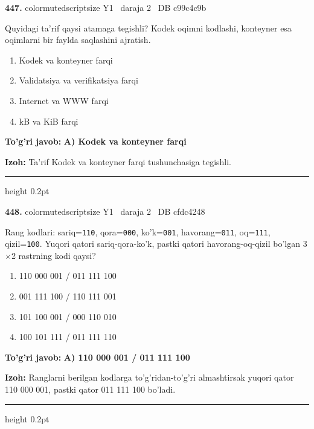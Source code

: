 \documentclass[10pt,a4paper,oneside]{article}
\begin{document}
\noindent\textbf{\color{ink}447.}  {color{muted}scriptsize Y1 \textbullet\ daraja 2 \textbullet\ DB c99c4c9b}
\par
Quyidagi ta'rif qaysi atamaga tegishli? Kodek oqimni kodlashi, konteyner esa oqimlarni bir faylda saqlashini ajratish.
\begin{enumerate}[label=\Alph*),leftmargin=9mm]
\item Kodek va konteyner farqi
\item Validatsiya va verifikatsiya farqi
\item Internet va WWW farqi
\item kB va KiB farqi
\end{enumerate}
\begin{tcolorbox}[enhanced,breakable,colback=teal!4,colframe=teal!50!black,boxrule=0.5pt,arc=1.1mm,left=3mm,right=3mm,top=1.7mm,bottom=1.7mm,before skip=2mm,after skip=2mm]
\textbf{\color{teal}To'g'ri javob:} \textbf{A) Kodek va konteyner farqi}
\par\smallskip
\textbf{Izoh:} Ta'rif Kodek va konteyner farqi tushunchasiga tegishli.
\end{tcolorbox}
\vspace{2mm}\hrule height 0.2pt \vspace{3mm}

\noindent\textbf{\color{ink}448.}  {color{muted}scriptsize Y1 \textbullet\ daraja 2 \textbullet\ DB cfdc4248}
\par
Rang kodlari: sariq=\texttt{110}, qora=\texttt{000}, ko'k=\texttt{001}, havorang=\texttt{011}, oq=\texttt{111}, qizil=\texttt{100}. Yuqori qatori sariq-qora-ko'k, pastki qatori havorang-oq-qizil bo'lgan 3\ensuremath{\times}2 rastrning kodi qaysi?
\begin{enumerate}[label=\Alph*),leftmargin=9mm]
\item 110 000 001 / 011 111 100
\item 001 111 100 / 110 111 001
\item 101 100 001 / 000 110 010
\item 100 101 111 / 011 111 110
\end{enumerate}
\begin{tcolorbox}[enhanced,breakable,colback=teal!4,colframe=teal!50!black,boxrule=0.5pt,arc=1.1mm,left=3mm,right=3mm,top=1.7mm,bottom=1.7mm,before skip=2mm,after skip=2mm]
\textbf{\color{teal}To'g'ri javob:} \textbf{A) 110 000 001 / 011 111 100}
\par\smallskip
\textbf{Izoh:} Ranglarni berilgan kodlarga to'g'ridan-to'g'ri almashtirsak yuqori qator 110 000 001, pastki qator 011 111 100 bo'ladi.
\end{tcolorbox}
\vspace{2mm}\hrule height 0.2pt \vspace{3mm}
\end{document}
